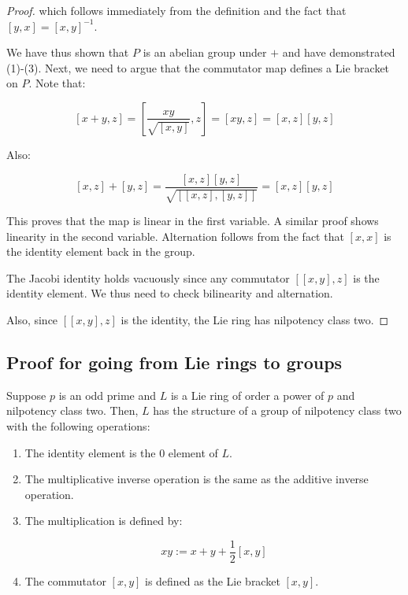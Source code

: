 \documentclass[10pt]{amsart}
\begin{document}
\begin{proof}
  which follows immediately from the definition and the fact that
  $[y,x] = [x,y]^{-1}$.

  We have thus shown that $P$ is an abelian group under $+$ and have
  demonstrated (1)-(3). Next, we need to argue that the commutator map
  defines a Lie bracket on $P$.
  Note that:

  $$[x+y,z] = [\frac{xy}{\sqrt{[x,y]}},z] = [xy,z] = [x,z][y,z]$$
  
  Also:

  $$[x,z] + [y,z] = \frac{[x,z][y,z]}{\sqrt{[[x,z],[y,z]]}} = [x,z][y,z]$$

  This proves that the map is linear in the first variable. A similar
  proof shows linearity in the second variable. Alternation follows
  from the fact that $[x,x]$ is the identity element back in the
  group.

  The Jacobi identity holds vacuously since any commutator
  $[[x,y],z]$ is the identity element. We thus need to check
  bilinearity and alternation.

  Also, since $[[x,y],z]$ is the identity, the Lie ring has nilpotency
  class two.
\end{proof}

\subsection{Proof for going from Lie rings to groups}

\begin{theorem}
  Suppose $p$ is an odd prime and $L$ is a Lie ring of order a power
  of $p$ and nilpotency class two. Then, $L$ has the structure of a
  group of nilpotency class two with the following operations:

  \begin{enumerate}
  \item The identity element is the $0$ element of $L$.
  \item The multiplicative inverse operation is the same as the
    additive inverse operation.
  \item The multiplication is defined by:

    $$xy := x + y + \frac{1}{2}[x,y]$$

  \item The commutator $[x,y]$ is defined as the Lie bracket $[x,y]$.
  \end{enumerate}
\end{theorem}
\end{document}
